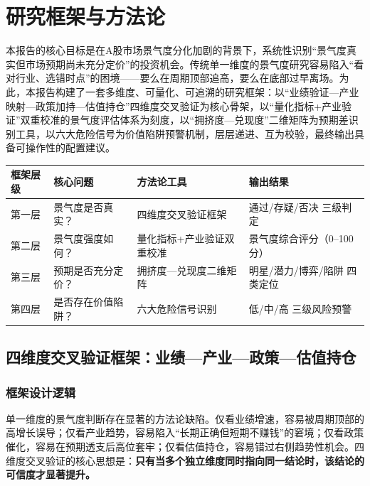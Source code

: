 
\chapter{研究框架与方法论}

本报告的核心目标是在A股市场景气度分化加剧的背景下，系统性识别“景气度真实但市场预期尚未充分定价”的投资机会。传统单一维度的景气度研究容易陷入“看对行业、选错时点”的困境——要么在周期顶部追高，要么在底部过早离场。为此，本报告构建了一套多维度、可量化、可追溯的研究框架：以“业绩验证—产业映射—政策加持—估值持仓”四维度交叉验证为核心骨架，以“量化指标+产业验证”双重校准的景气度评估体系为刻度，以“拥挤度—兑现度”二维矩阵为预期差识别工具，以六大危险信号为价值陷阱预警机制，层层递进、互为校验，最终输出具备可操作性的配置建议。

\begin{dashboardbox}[第二章研究框架总览]
\small
\begin{tabularx}{\textwidth}{L{2.5cm}X L{2.2cm}X}
\toprule
\textbf{框架层级} & \textbf{核心问题} & \textbf{方法论工具} & \textbf{输出结果} \\
\midrule
第一层 & 景气度是否真实？ & 四维度交叉验证框架 & 通过/存疑/否决 三级判定 \\
第二层 & 景气度强度如何？ & 量化指标+产业验证双重校准 & 景气度综合评分（0--100分） \\
第三层 & 预期是否充分定价？ & 拥挤度—兑现度二维矩阵 & 明星/潜力/博弈/陷阱 四类定位 \\
第四层 & 是否存在价值陷阱？ & 六大危险信号识别 & 低/中/高 三级风险预警 \\
\bottomrule
\end{tabularx}
\end{dashboardbox}

\section{四维度交叉验证框架：业绩—产业—政策—估值持仓}

\subsection{框架设计逻辑}

单一维度的景气度判断存在显著的方法论缺陷。仅看业绩增速，容易被周期顶部的高增长误导；仅看产业趋势，容易陷入“长期正确但短期不赚钱”的窘境；仅看政策催化，容易在预期透支后高位套牢；仅看估值持仓，容易错过右侧趋势性机会。四维度交叉验证的核心思想是：\textbf{只有当多个独立维度同时指向同一结论时，该结论的可信度才显著提升。}

